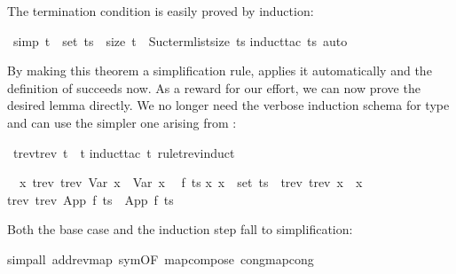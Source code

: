 %
\begin{isabellebody}%
\def\isabellecontext{Nested{\isadigit{2}}}%
%
\begin{isamarkuptext}%
The termination condition is easily proved by induction:%
\end{isamarkuptext}%
\ {\isacharbrackleft}simp{\isacharbrackright}{\isacharcolon}\ {\isachardoublequote}t\ {\isasymin}\ set\ ts\ {\isasymlongrightarrow}\ size\ t\ {\isacharless}\ Suc{\isacharparenleft}term{\isacharunderscore}list{\isacharunderscore}size\ ts{\isacharparenright}{\isachardoublequote}\isanewline
{}induct{\isacharunderscore}tac\ ts{\isacharcomma}\ auto{\isacharparenright}%
\begin{isamarkuptext}%
\noindent
By making this theorem a simplification rule, 
applies it automatically and the definition of 
succeeds now. As a reward for our effort, we can now prove the desired
lemma directly.  We no longer need the verbose
induction schema for type  and can use the simpler one arising from
:%
\end{isamarkuptext}%
\ {\isachardoublequote}trev{\isacharparenleft}trev\ t{\isacharparenright}\ {\isacharequal}\ t{\isachardoublequote}\isanewline
{}induct{\isacharunderscore}tac\ t\ rule{\isacharcolon}trev{\isachardot}induct{\isacharparenright}%
\begin{isamarkuptxt}%
\begin{isabelle}%
\ {}{\isachardot}\ {\isasymAnd}x{\isachardot}\ trev\ {\isacharparenleft}trev\ {\isacharparenleft}Var\ x{\isacharparenright}{\isacharparenright}\ {\isacharequal}\ Var\ x\isanewline
\ {}{\isachardot}\ {\isasymAnd}f\ ts{\isachardot}\isanewline
{}x{\isachardot}\ x\ {\isasymin}\ set\ ts\ {\isasymlongrightarrow}\ trev\ {\isacharparenleft}trev\ x{\isacharparenright}\ {\isacharequal}\ x\ {\isasymLongrightarrow}\isanewline
{}trev\ {\isacharparenleft}trev\ {\isacharparenleft}App\ f\ ts{\isacharparenright}{\isacharparenright}\ {\isacharequal}\ App\ f\ ts%
\end{isabelle}
Both the base case and the induction step fall to simplification:%
\end{isamarkuptxt}%
simp{\isacharunderscore}all\ add{\isacharcolon}rev{\isacharunderscore}map\ sym{\isacharbrackleft}OF\ map{\isacharunderscore}compose{\isacharbrackright}\ cong{\isacharcolon}map{\isacharunderscore}cong{\isacharparenright}%

\end{isabellebody}
